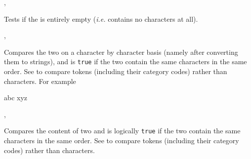 \documentclass[oneside]{book}
\begin{document}
\begin{function}{\StrVarIfEmpty,\StrVarIfEmptyTF}
\begin{syntax}
 
   
\end{syntax}
Tests if the  is entirely empty
(\emph{i.e.} contains no characters at all).
\begin{demohigh}
\StrSet {}
\StrVarIfEmptyTF {} {}
\StrClear \lTmpaStr
\StrVarIfEmptyTF {} {}
\end{demohigh}
\end{function}

\begin{function}{\StrIfEq,\StrIfEqTF}
\begin{syntax}
  
    
\end{syntax}
Compares the two  on a character by character
basis (namely after converting them to strings),
and is \texttt{true} if the two  contain the same
characters in the same order.
See  to compare
tokens (including their category codes) rather than characters.
For example
\begin{demohigh}
 {abc} {} {}
 {xyz} {} {}
\end{demohigh}
\end{function}

\begin{function}{\StrVarIfEq,\StrVarIfEqTF}
\begin{syntax}
  
    
\end{syntax}
Compares the content of two  and
is logically \texttt{true} if the two contain the same characters
in the same order.  See  to compare tokens
(including their category codes) rather than characters.
\begin{demohigh}
\StrSet {}
\StrSet {}
\StrSet {}
\StrVarIfEqTF \lTmpaStr {} {}
\StrVarIfEqTF \lTmpaStr {} {}
\end{demohigh}
\end{function}
\end{document}
